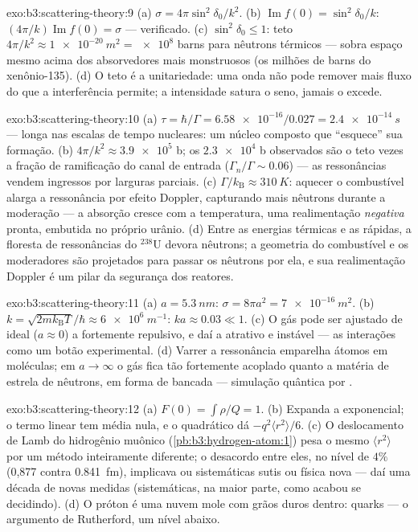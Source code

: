 \begin{solution}{exo:b3:scattering-theory:9}
(a) $\sigma = 4\pi\sin^2\delta_0/k^2$. (b) $\operatorname{Im}f(0)
= \sin^2\delta_0/k$: $(4\pi/k)\operatorname{Im}f(0) = \sigma$ ---
verificado. (c) $\sin^2\delta_0 \le 1$: teto $4\pi/k^2 \approx
\qty{1e-20}{m^2} = \num{e8}$ barns para nêutrons térmicos --- sobra
espaço mesmo acima dos absorvedores mais monstruosos (os milhões de
barns do xenônio-135). (d) O teto é a unitariedade: uma onda não pode
remover mais fluxo do que a interferência permite; a intensidade satura
o seno, jamais o excede.
\end{solution}

\begin{solution}{exo:b3:scattering-theory:10}
(a) $\tau = \hbar/\Gamma = \num{6.58e-16}/0.027 =
\qty{2.4e-14}{s}$ --- longa nas escalas de tempo nucleares: um núcleo
composto que ``esquece'' sua formação. (b) $4\pi/k^2 \approx
\num{3.9e5}$ b; os $\num{2.3e4}$ b observados são o teto vezes a fração
de ramificação do canal de entrada ($\Gamma_n/\Gamma
\sim 0.06$) --- as ressonâncias vendem ingressos por larguras parciais.
(c) $\Gamma/k_{\text{B}} \approx \qty{310}{K}$: aquecer o combustível
alarga a ressonância por efeito Doppler, capturando mais nêutrons
durante a moderação --- a absorção cresce com a temperatura, uma
realimentação \emph{negativa} pronta, embutida no próprio urânio. (d)
Entre as energias térmicas e as rápidas, a floresta de ressonâncias do
$^{238}$U devora nêutrons; a geometria do combustível e os moderadores
são projetados para passar os nêutrons por ela, e sua realimentação
Doppler é um pilar da segurança dos reatores.
\end{solution}

\begin{solution}{exo:b3:scattering-theory:11}
(a) $a = \qty{5.3}{nm}$: $\sigma = 8\pi a^2 = \qty{7e-16}{m^2}$.
(b) $k = \sqrt{2mk_{\text{B}}T}/\hbar \approx \qty{6e6}{m^{-1}}$:
$ka \approx 0.03 \ll 1$. (c) O gás pode ser ajustado de ideal
($a \approx 0$) a fortemente repulsivo, e daí a atrativo e instável ---
as interações como um botão experimental. (d) Varrer a ressonância
emparelha átomos em moléculas; em $a \to
\infty$ o gás fica tão fortemente acoplado quanto a matéria de estrela
de nêutrons, em forma de bancada --- simulação quântica por .
\end{solution}

\begin{solution}{exo:b3:scattering-theory:12}
(a) $F(0) = \int\rho/Q = 1$. (b) Expanda a exponencial; o termo linear
tem média nula, e o quadrático dá
$-q^2\langle r^2\rangle/6$. (c) O deslocamento de Lamb do hidrogênio
muônico (\cref{pb:b3:hydrogen-atom:1}) pesa o mesmo
$\langle r^2\rangle$ por um método inteiramente diferente; o desacordo
entre eles, no nível de $4\%$ (0,877 contra \qty{0.841}{fm}), implicava
ou sistemáticas sutis ou física nova --- daí uma década de novas
medidas (sistemáticas, na maior parte, como acabou se decidindo).
(d) O próton é uma nuvem mole com grãos duros dentro: quarks --- o
argumento de Rutherford, um nível abaixo.
\end{solution}

